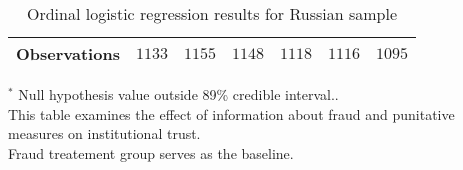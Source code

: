 \begin{table}
\begin{center}
\begin{threeparttable}
\begin{tabular}{l c c c c c c}
\hline
Observations        & $1133$            & $1155$            & $1148$            & $1118$            & $1116$            & $1095$            \\
\hline
\end{tabular}
\begin{tablenotes}[flushleft]
\scriptsize{$^*$ Null hypothesis value outside 89\% credible interval..  \\
This table examines the effect of information about fraud
                      and punitative measures on institutional trust. \\
Fraud treatement group serves as the baseline.}
\end{tablenotes}
\end{threeparttable}
\caption{Ordinal logistic regression results for Russian sample}
\label{table:coefficients}
\end{center}
\end{table}

